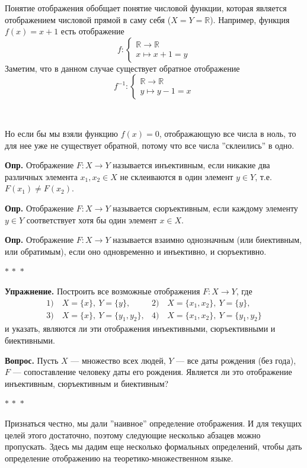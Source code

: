 \documentclass[a4paper,12pt]{article}
\newcommand{\R}{\mathbb{R}}
\newcommand{\threestars}{\begin{center}$ {\ast}\,{\ast}\,{\ast} $\end{center}}
\newcounter{th-counter}
\newcounter{df-counter}
\newcommand{\df}{\par\noindent\textbf{Опр.} }
\begin{document}
Понятие отображения обобщает понятие числовой функции, которая является отображением числовой прямой в саму себя ($X = Y = \R$). Например, функция $f(x) = x + 1$ есть отображение
$$
f : \begin{cases}
    \R \rightarrow \R\\
    x \mapsto x + 1 = y
\end{cases}
$$
Заметим, что в данном случае существует обратное отображение 
\[f^{-1}: 
\begin{cases}
     \R \rightarrow \R\\
     y \mapsto y - 1 = x
\end{cases}\]

\

Но если бы мы взяли функцию $f(x) = 0$, отображающую все числа в ноль, то для нее уже не существует обратной, потому что все числа ''склеились'' в одно.

\df Отображение $F : X \rightarrow Y$ называется инъективным, если никакие два различных элемента $x_1, x_2 \in X$ не склеиваются в один элемент $y \in Y$, т.е. $F(x_1) \neq F(x_2)$.

\df Отображение $F : X \rightarrow Y$ называется сюръективным, если каждому элементу $y \in Y$ соответствует хотя бы один элемент $x \in X$.

\df Отображение $F : X \rightarrow Y$ называется взаимно однозначным (или биективным, или обратимым), если оно одновременно и инъективно, и сюръективно.

\threestars

\noindent\textbf{Упражнение.} Построить все возможные отображения $F: X \rightarrow Y$, где
\[ 
\begin{array}{ll}
     1)\quad X = \{x\}, \ Y = \{y\}, &2) \quad X = \{x_1, x_2\}, \ Y = \{y\},\\
     3)\quad X = \{x\}, \ Y = \{y_1, y_2\},  & 4) \quad X = \{x_1, x_2\}, \ Y = \{y_1, y_2\}
\end{array}
\]
и указать, являются ли эти отображения инъективными, сюръективными и биективными.

\noindent\textbf{Вопрос.} Пусть $X$ --- множество всех людей, $Y$ --- все даты рождения (без года), $F$ --- сопоставление человеку даты его рождения. Является ли это отображение инъективным, сюръективным и биективным?

\threestars
Признаться честно, мы дали ''наивное'' определение отображения. И для текущих целей этого достаточно, поэтому следующие несколько абзацев можно пропускать. Здесь мы дадим еще несколько формальных определений, чтобы дать определение отображению на теоретико-множественном языке.
\end{document}
